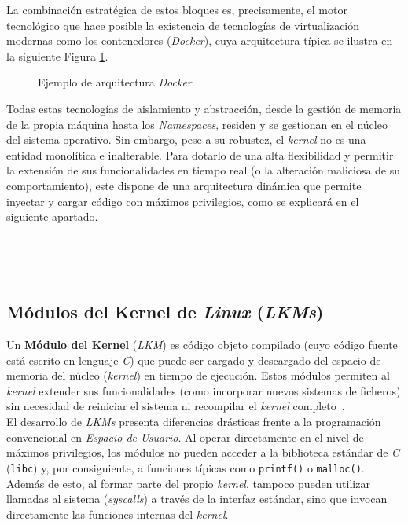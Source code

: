La combinación estratégica de estos bloques es, precisamente, el motor tecnológico que hace posible la existencia de tecnologías de virtualización modernas como los contenedores (\textit{Docker}),
cuya arquitectura típica se ilustra en la siguiente Figura \ref{fig:ns-docker}.

\begin{figure}[h!]
  \centering
  \scalebox{0.8}{}
  \caption{Ejemplo de arquitectura \textit{Docker}.}
  \label{fig:ns-docker}
\end{figure}

Todas estas tecnologías de aislamiento y abstracción, desde la gestión de memoria de la propia máquina hasta los \textit{Namespaces}, residen y se gestionan en el núcleo del sistema operativo.
Sin embargo, pese a su robustez, el \textit{kernel} no es una entidad monolítica e inalterable.
Para dotarlo de una alta flexibilidad y permitir la extensión de sus funcionalidades en tiempo real (o la alteración maliciosa de su comportamiento), este dispone de una arquitectura dinámica que permite inyectar y cargar código con máximos privilegios, como se explicará en el siguiente apartado.

\

\

\subsection{Módulos del Kernel de \textit{Linux} (\textit{LKMs})}
\label{sec:lkms}

Un \textbf{Módulo del Kernel} (\textit{LKM}) es código objeto compilado (cuyo código fuente está escrito en lenguaje \textit{C}) que puede ser cargado y descargado del espacio de memoria del núcleo (\textit{kernel}) en tiempo de ejecución.
Estos módulos permiten al \textit{kernel} extender sus funcionalidades (como incorporar nuevos sistemas de ficheros) sin necesidad de reiniciar el sistema ni recompilar el \textit{kernel} completo~\cite{geeks_lkm}.\\

El desarrollo de \textit{LKMs} presenta diferencias drásticas frente a la programación convencional en \textit{Espacio de Usuario}.
Al operar directamente en el nivel de máximos privilegios, los módulos no pueden acceder a la biblioteca estándar de \textit{C} (\texttt{libc}) y, por consiguiente, a funciones típicas como \texttt{printf()} o \texttt{malloc()}.
Además de esto, al formar parte del propio \textit{kernel}, tampoco pueden utilizar llamadas al sistema (\textit{syscalls}) a través de la interfaz estándar, sino que invocan directamente las funciones internas del \textit{kernel}.\\

